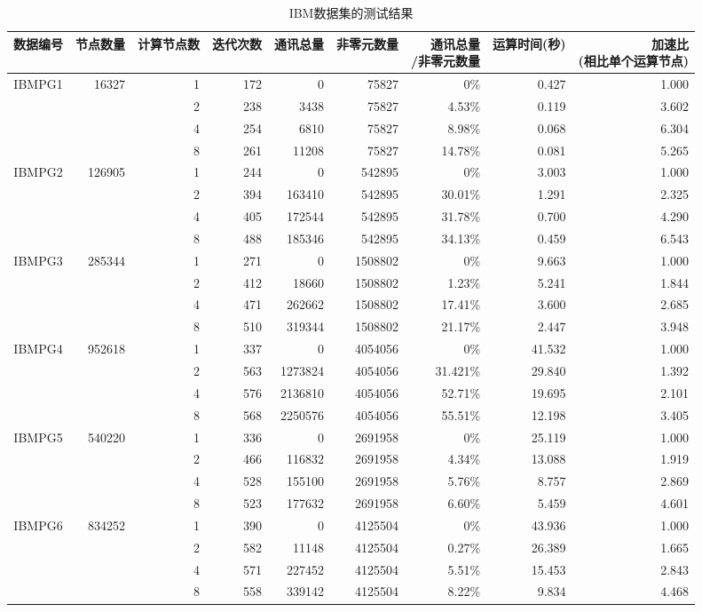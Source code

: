 \begin{sidewaystable}[htbp]
\centering
\caption{IBM数据集的测试结果}
\label{tab:tabibmresult}
\begin{tabular}{c|r|r|r|r|r|r|r|r}
\toprule[1.5pt]
\hline
数据编号 & 节点数量 & \textbf{计算节点数} & 迭代次数 & 通讯总量 & 非零元数量 & \makecell{通讯总量\\/非零元数量} & 运算时间(秒)
& \makecell{ \textbf{加速比} \\ \textbf{(相比单个运算节点)} } \\
\hline
IBMPG1 & 16327  & 1 & 172   &  0 & 75827 & 0\% & 0.427 & 1.000\\
\hline
& & 2 & 238 & 3438 & 75827 & 4.53\% & 0.119 & 3.602 \\
\hline
& & 4 & 254 & 6810 & 75827 &  8.98\% &  0.068 & 6.304 \\
\hline
& & 8 & 261 & 11208 & 75827 & 14.78\% & 0.081 & 5.265 \\
\hline
IBMPG2 & 126905 & 1 & 244 & 0 & 542895 & 0\% & 3.003 & 1.000 \\
\hline
& & 2 & 394 & 163410 & 542895 & 30.01\% & 1.291 & 2.325 \\
\hline
& & 4 & 405 & 172544 & 542895 & 31.78\% &  0.700 & 4.290 \\
\hline
& & 8 & 488 & 185346 & 542895 & 34.13\% & 0.459 & 6.543 \\
\hline
IBMPG3 & 285344 & 1 & 271 & 0 & 1508802 & 0\% & 9.663 & 1.000 \\
\hline
& & 2 & 412 & 18660 & 1508802 & 1.23\% & 5.241 & 1.844 \\
\hline
& & 4 & 471 & 262662 & 1508802 & 17.41\% & 3.600 & 2.685 \\
\hline
& & 8 & 510 & 319344 & 1508802 & 21.17\% & 2.447 & 3.948 \\
\hline
IBMPG4 & 952618 & 1 & 337 & 0 & 4054056 & 0\% & 41.532 & 1.000 \\
\hline
& & 2 & 563 & 1273824 & 4054056 & 31.421\% & 29.840 & 1.392 \\
\hline
& & 4 & 576 & 2136810 & 4054056 & 52.71\% & 19.695 & 2.101 \\
\hline
& & 8 & 568 & 2250576 & 4054056 & 55.51\% & 12.198 & 3.405 \\
\hline
IBMPG5 & 540220 & 1 & 336 & 0 & 2691958 & 0\% & 25.119 & 1.000 \\
\hline
& & 2 & 466 & 116832 & 2691958 & 4.34\% & 13.088 & 1.919 \\
\hline
& & 4 & 528 & 155100 & 2691958 & 5.76\% & 8.757 & 2.869 \\
\hline
& & 8 & 523 & 177632 & 2691958 & 6.60\% & 5.459 & 4.601 \\
\hline
IBMPG6 & 834252 & 1 & 390 & 0 & 4125504 & 0\% & 43.936 & 1.000 \\
\hline
& & 2 & 582 & 11148 & 4125504 & 0.27\% & 26.389 & 1.665 \\
\hline
& & 4 & 571 & 227452 & 4125504 & 5.51\% & 15.453 & 2.843 \\
\hline
& & 8 & 558 & 339142 & 4125504 & 8.22\% & 9.834 & 4.468 \\
\hline
\end{tabular}
\end{sidewaystable}

